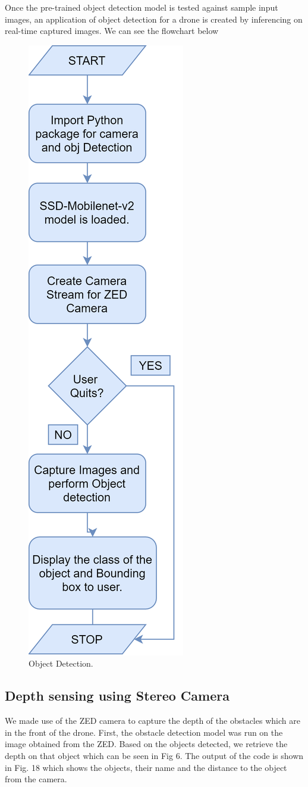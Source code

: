 \documentclass{IEEEtran}
\begin{document}
Once the pre-trained object detection model is tested against sample input images, an application of object detection for a drone is created by inferencing on real-time captured images. We can see the flowchart below

\begin{figure}[htb]
\centering
\includegraphics[width=0.4\linewidth]{fig/flow_saumil.png}
\caption{Object Detection.} \label{fig.structure}
\end{figure}


\subsection{Depth sensing using Stereo Camera}
We made use of the ZED camera to capture the depth of the obstacles which are in the front of the drone. First, the obstacle detection model was run on the image obtained from the ZED. Based on the objects detected, we retrieve the depth on that object which can be seen in Fig 6. The output of the code is shown in Fig. 18 which shows the objects, their name and the distance to the object from the camera.
\end{document}
